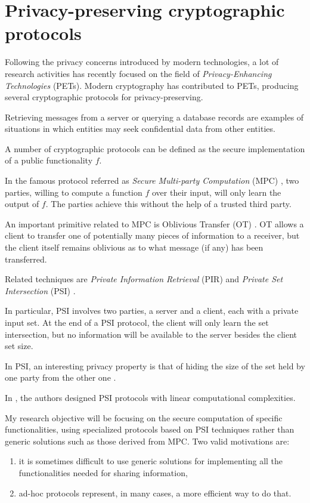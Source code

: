 \documentclass[dvips,12pt]{article}
\begin{document}
\section{Privacy-preserving cryptographic protocols}
Following the privacy concerns introduced by modern technologies, a lot of research activities has recently focused on the field of \emph{Privacy-Enhancing Technologies} (PETs).
Modern cryptography has contributed to PETs, producing several cryptographic protocols for privacy-preserving.

Retrieving messages from a server or querying a database records are examples of situations in which entities may seek confidential data from other entities. 
 
A number of cryptographic protocols can be defined as the secure implementation of a public functionality $f$.

In the famous protocol referred as \emph{Secure Multi-party Computation} (MPC) \cite{Yao}, two parties, willing to compute a function $f$ over their input, will only learn the output of $f$.
The parties achieve this without the help of a trusted third party.


An important primitive related to MPC is Oblivious Transfer (OT) \cite{oblivious}.
OT allows a client to transfer one of potentially many pieces of information to a receiver, but the client itself remains oblivious as to what message (if any) has been transferred.

Related techniques are \emph{Private Information Retrieval} (PIR) \cite{pir} and \emph{Private Set Intersection} (PSI) \cite{psi}. 

In particular, PSI involves two parties, a server and a client, each with a private input set.
At the end of a PSI protocol, the client will only learn the set intersection, but no information will be available to the server besides the client set size.

In PSI, an interesting privacy property is that of hiding the size of the set held by one party from the other one \cite{size-psi}.

In \cite{lin-psi,linear-psi}, the authors designed PSI protocols with linear computational complexities.

My research objective will be focusing on the secure computation of specific functionalities, using specialized protocols based on PSI techniques rather than generic solutions such as those derived from MPC.
Two valid motivations are:
\begin{enumerate}
\item it is sometimes difficult to use generic solutions for implementing all the functionalities needed for sharing information,
\item ad-hoc protocols represent, in many cases, a more efficient way to do that.
\end{enumerate} 
\end{document}
